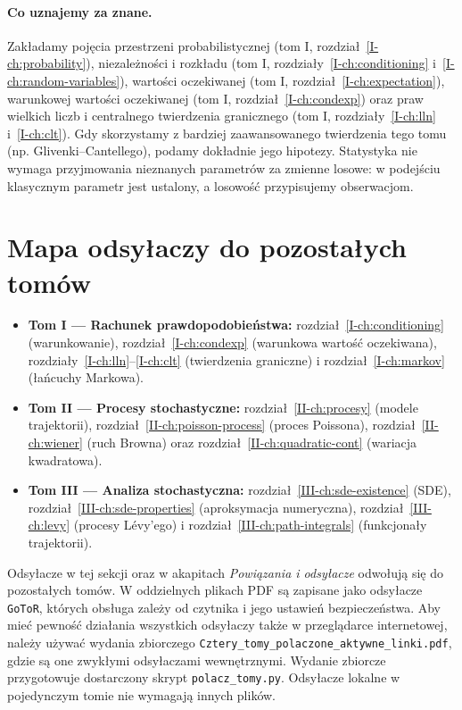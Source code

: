 \documentclass[11pt,a4paper,oneside]{report}
\numberwithin{equation}{chapter}
\theoremstyle{plain}
\theoremstyle{definition}
\theoremstyle{remark}
\begin{document}
\paragraph{Co uznajemy za znane.}
Zakładamy pojęcia przestrzeni probabilistycznej (tom I, rozdział~\ref{I-ch:probability}), niezależności i rozkładu (tom I, rozdziały~\ref{I-ch:conditioning} i~\ref{I-ch:random-variables}), wartości oczekiwanej (tom I, rozdział~\ref{I-ch:expectation}), warunkowej wartości oczekiwanej (tom I, rozdział~\ref{I-ch:condexp}) oraz praw wielkich liczb i centralnego twierdzenia granicznego (tom I, rozdziały~\ref{I-ch:lln} i~\ref{I-ch:clt}). Gdy skorzystamy z bardziej zaawansowanego twierdzenia tego tomu (np. Glivenki--Cantellego), podamy dokładnie jego hipotezy. Statystyka nie wymaga przyjmowania nieznanych parametrów za zmienne losowe: w podejściu klasycznym parametr jest ustalony, a losowość przypisujemy obserwacjom.


\section*{Mapa odsyłaczy do pozostałych tomów}
\begin{itemize}
\item \textbf{Tom I — Rachunek prawdopodobieństwa:} rozdział~\ref{I-ch:conditioning} (warunkowanie), rozdział~\ref{I-ch:condexp} (warunkowa wartość oczekiwana), rozdziały~\ref{I-ch:lln}--\ref{I-ch:clt} (twierdzenia graniczne) i rozdział~\ref{I-ch:markov} (łańcuchy Markowa).
\item \textbf{Tom II — Procesy stochastyczne:} rozdział~\ref{II-ch:procesy} (modele trajektorii), rozdział~\ref{II-ch:poisson-process} (proces Poissona), rozdział~\ref{II-ch:wiener} (ruch Browna) oraz rozdział~\ref{II-ch:quadratic-cont} (wariacja kwadratowa).
\item \textbf{Tom III — Analiza stochastyczna:} rozdział~\ref{III-ch:sde-existence} (SDE), rozdział~\ref{III-ch:sde-properties} (aproksymacja numeryczna), rozdział~\ref{III-ch:levy} (procesy Lévy'ego) i rozdział~\ref{III-ch:path-integrals} (funkcjonały trajektorii).
\end{itemize}
Odsyłacze w tej sekcji oraz w akapitach \emph{Powiązania i odsyłacze} odwołują się do pozostałych tomów. W oddzielnych plikach PDF są zapisane jako odsyłacze \texttt{GoToR}, których obsługa zależy od czytnika i jego ustawień bezpieczeństwa. Aby mieć pewność działania wszystkich odsyłaczy także w przeglądarce internetowej, należy używać wydania zbiorczego \texttt{Cztery\_tomy\_polaczone\_aktywne\_linki.pdf}, gdzie są one zwykłymi odsyłaczami wewnętrznymi. Wydanie zbiorcze przygotowuje dostarczony skrypt \texttt{polacz\_tomy.py}. Odsyłacze lokalne w pojedynczym tomie nie wymagają innych plików.
\end{document}
